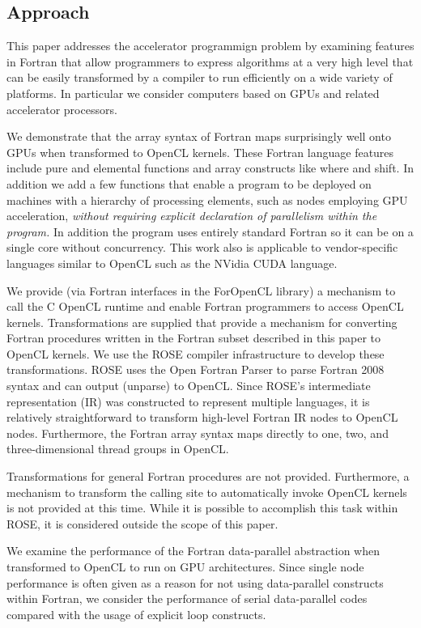 \subsection{Approach}

This paper addresses the accelerator programmign problem by examining
features in Fortran that allow programmers to express algorithms at a
very high level that can be easily transformed by a compiler to run
efficiently on a wide variety of platforms.  In particular we consider
computers based on GPUs and related accelerator processors.

We demonstrate that the array syntax of Fortran maps surprisingly well
onto GPUs when transformed to OpenCL kernels.  These Fortran language
features include pure and elemental functions and array constructs
like where and shift.  In addition we add a few functions that enable
a program to be deployed on machines with a hierarchy of processing
elements, such as nodes employing GPU acceleration, \emph{without
  requiring explicit declaration of parallelism within the program.}
In addition the program uses entirely standard Fortran so it can be on
a single core without concurrency.  This work also is applicable
to vendor-specific languages similar to OpenCL such as the NVidia
CUDA language.

We provide (via Fortran interfaces in the ForOpenCL library) a mechanism to
call the C OpenCL runtime and enable Fortran programmers to access OpenCL
kernels.  Transformations are supplied that provide a mechanism for converting
Fortran procedures written in the Fortran subset described in this paper to
OpenCL kernels.  We use the ROSE compiler infrastructure \cite{} to develop
these transformations.  ROSE uses the Open Fortran Parser \cite{} to parse
Fortran 2008 syntax and can output (unparse) to OpenCL.  Since ROSE's
intermediate representation (IR) was constructed to represent multiple
languages, it is relatively straightforward to transform high-level Fortran IR
nodes to OpenCL nodes.  Furthermore, the Fortran array syntax maps directly to
one, two, and three-dimensional thread groups in OpenCL.

Transformations for general Fortran procedures are not provided.  Furthermore,
a mechanism to transform the calling site to automatically invoke
OpenCL kernels is not provided at this time.  While it is possible to
accomplish this task within ROSE, it is considered outside the scope of this
paper.

We examine the performance of the Fortran data-parallel abstraction when
transformed to OpenCL to run on GPU architectures.  Since single node performance
is often given as a reason for not using data-parallel constructs within Fortran,
we consider the performance of serial data-parallel codes compared with the
usage of explicit loop constructs.


